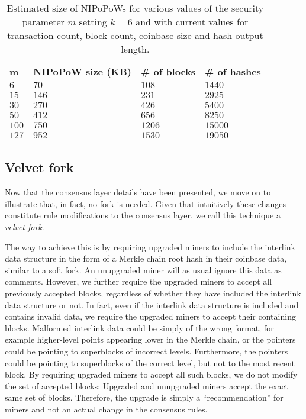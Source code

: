 \begin{table}
  \caption{\label{table.size}
    Estimated size of NIPoPoWs for various values of the security parameter $m$
    setting $k = 6$ and with current values for transaction count, block count,
    coinbase size and hash output length.}
  \begin{tabular}{llll}
      {\bf m}  & {\bf NIPoPoW size (KB)} & {\bf \# of blocks} & {\bf
      \# of hashes}\\
      $6$   & $70$  & $108$ & $1440$  \\
      $15$  & $146$ & $231$ & $2925$  \\
      $30$  & $270$ & $426$ & $5400$  \\
      $50$  & $412$ & $656$ & $8250$ \\
      $100$ & $750$ & $1206$ & $15000$ \\
      $127$ & $952$ & $1530$ & $19050$ \\
  \end{tabular}
\end{table}

\subsection{Velvet fork}

Now that the consensus layer details have been presented, we move on to
illustrate that, in fact, no fork is needed. Given that intuitively these
changes constitute rule modifications to the consensus layer, we call this
technique a \textit{velvet fork}.

The way to achieve this is by requiring upgraded miners to include the
interlink data structure in the form of a Merkle chain root hash in their
coinbase data, similar to a soft fork. An unupgraded miner will as usual ignore
this data as comments. However, we further require the upgraded miners to
accept all previously accepted blocks, regardless of whether they have included
the interlink data structure or not. In fact, even if the interlink data
structure is included and contains invalid data, we require the upgraded miners
to accept their containing blocks. Malformed interlink data could be simply of
the wrong format, for example higher-level points appearing lower in the Merkle
chain, or the pointers could be pointing to superblocks of incorrect
levels. Furthermore, the pointers could be pointing to superblocks of the
correct level, but not to the most recent block. By requiring upgraded miners
to accept all such blocks, we do not modify the set of accepted blocks:
Upgraded and unupgraded miners accept the exact same set of blocks. Therefore,
the upgrade is simply a ``recommendation'' for miners and not an actual change in
the consensus rules.

